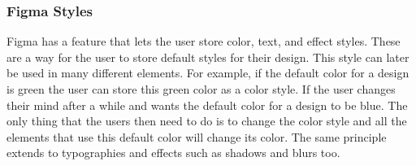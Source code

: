 \subsubsection{Figma Styles}%
\label{ssub:Styles}
Figma has a feature that lets the user store color, text, and effect styles. These are a way for the user to store default styles for their design. This style can later be used in many different elements. For example, if the default color for a design is green the user can store this green color as a color style. If the user changes their mind after a while and wants the default color for a design to be blue. The only thing that the users then need to do is to change the color style and all the elements that use this default color will change its color. The same principle extends to typographies and effects such as shadows and blurs too. 











